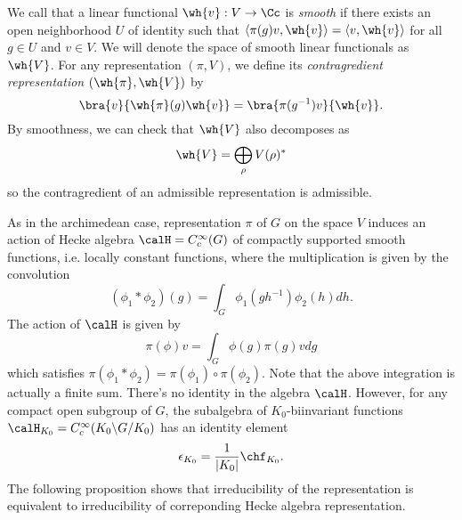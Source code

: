 \documentclass{article}
\begin{document}
We call that a linear functional $\wh{v}:V\to \Cc$ is \emph{smooth} if there exists an open neighborhood $U$ of identity such that $\langle \pi(g)v, \wh{v}\rangle = \langle v, \wh{v}\rangle$ for all $g\in U$ and $v\in V$. 
We will denote the space of smooth linear functionals as $\wh{V}$. For any representation $(\pi, V)$, we define its \emph{contragredient representation} $(\wh{\pi}, \wh{V})$ by 
$$
\bra{v}{\wh{\pi}(g)\wh{v}} = \bra{\pi(g^{-1})v}{\wh{v}}.
$$
By smoothness, we can check that $\wh{V}$ also decomposes as
$$
\wh{V} = \bigoplus_{\rho} V(\rho)^{*}
$$
so the contragredient of an admissible representation is admissible. 

As in the archimedean case, representation $\pi$ of $G$ on the space $V$ induces an action of Hecke algebra $\calH = C_{c}^{\infty}(G)$ of compactly supported smooth functions, i.e. locally constant functions, where the multiplication is given by the convolution 
$$
(\phi_{1} * \phi_{2})(g) = \int_{G} \phi_{1}(gh^{-1})\phi_{2}(h) dh.
$$
The action of $\calH$ is given by 
$$
\pi(\phi)v = \int_{G} \phi(g)\pi(g)vdg
$$
which satisfies $\pi(\phi_{1}*\phi_{2}) = \pi(\phi_{1})\circ \pi(\phi_{2})$. Note that the above integration is actually a finite sum. 
There's no identity in the algebra $\calH$. However, for any compact open subgroup of $G$, the subalgebra of $K_{0}$-biinvariant functions $\calH_{K_{0}} = C_{c}^{\infty}(K_{0}\backslash G/K_{0})$ has an identity element 
$$
\epsilon_{K_{0}} = \frac{1}{|K_{0}|} \chf_{K_{0}}. 
$$
The following proposition shows that irreducibility of the representation is equivalent to irreducibility of correponding Hecke algebra representation. 
\end{document}
